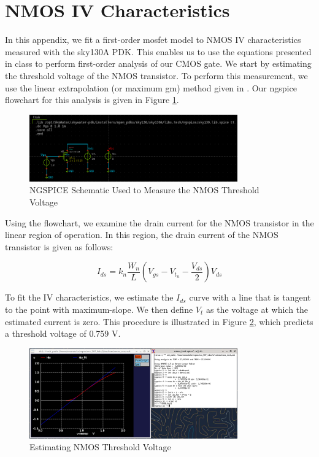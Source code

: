 \documentclass[fleqn]{article}
\begin{document}
	
	
	\pagebreak
	\appendix
	\section{NMOS IV Characteristics}
	\label{appendix::nmos_iv_characteristics}
	
	In this appendix, we fit a first-order mosfet model to NMOS IV characteristics measured with the sky130A PDK. This enables us to use the equations presented in class to perform first-order analysis of our CMOS gate. We start by estimating the threshold voltage of the NMOS transistor. To perform this measurement, we use the linear extrapolation (or maximum gm) method given in \cite{cmos_vlsi_design}. Our ngspice flowchart for this analysis is given in Figure \ref{fig::nmos_vt_meas_schem}.
	
	\begin{figure}[H]
		\centerline{\includegraphics[width=0.8\textwidth]{nmos_vt_meas_schem.png}}
		\caption{NGSPICE Schematic Used to Measure the NMOS Threshold Voltage}
		\label{fig::nmos_vt_meas_schem}
	\end{figure}
	
	\noindent Using the flowchart, we examine the drain current for the NMOS transistor in the linear region of operation. In this region, the drain current of the NMOS transistor is given as follows:
	
	\begin{equation}
		I_{ds} = k_n\frac{W_n}{L}\left(V_{gs} - V_{t_n} - \frac{V_{ds}}{2}\right)V_{ds}
	\end{equation}
	
	\noindent To fit the IV characteristics, we estimate the $I_{ds}$ curve with a line that is tangent to the point with maximum-slope. We then define $V_t$ as the voltage at which the estimated current is zero. This procedure is illustrated in Figure \ref{fig::nmos_vt_meas}, which predicts a threshold voltage of 0.759 V.
	
	\begin{figure}[H]
		\centerline{\includegraphics[width=0.8\textwidth]{nmos_vt_meas.png}}
		\caption{Estimating NMOS Threshold Voltage}
		\label{fig::nmos_vt_meas}
	\end{figure}
	
\end{document}
